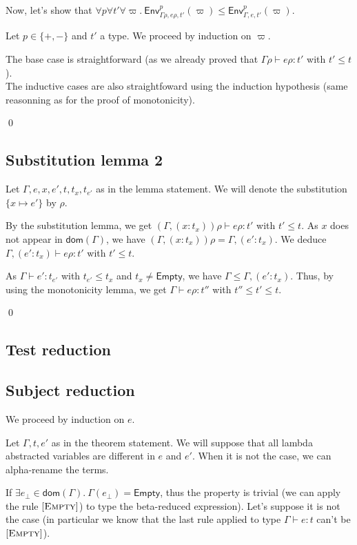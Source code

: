 \documentclass[a4paper]{article}%
\newcommand{\dom}[1]{\textsf{dom}(#1)}
\newcommand{\Empty} {\textsf{Empty}}%
\newcommand{\subst}[2]{\{#1 \mapsto #2\}}
\newcommand{\Gp}[2]{\textsf{Env}^{#1}_{#2}}
\theoremstyle{definition}
\newcommand {\Rule}[1] {[\textsc{#1}]}
\begin{document}
    Now, let's show that $\forall p \forall t' \forall \varpi.\ \Gp p {\Gamma\rho,e\rho,t'} (\varpi) \leq \Gp p {\Gamma,e,t'} (\varpi)$.

    Let $p\in \{+,-\}$ and $t'$ a type.
    We proceed by induction on $\varpi$.

    The base case is straightforward (as we already proved that $\Gamma \rho \vdash e \rho:t'$ with $t'\leq t$).\\
    The inductive cases are also straightfoward using the induction hypothesis (same reasonning as for the proof of monotonicity).

    \qed

    \subsection{Substitution lemma 2}

    Let $\Gamma,e,x,e',t,t_x,t_{e'}$ as in the lemma statement.
    We will denote the substitution $\subst x {e'}$ by $\rho$.

    By the substitution lemma, we get $(\Gamma, (x:t_x))\rho \vdash e\rho:t'$ with $t' \leq t$.
    As $x$ does not appear in $\dom \Gamma$, we have $(\Gamma, (x:t_x))\rho = \Gamma, (e':t_x)$.
    We deduce $\Gamma, (e':t_x) \vdash e\rho:t'$ with $t' \leq t$.

    As $\Gamma \vdash e':t_{e'}$ with $t_{e'} \leq t_x$ and $t_x \neq \Empty$, we have $\Gamma \leq \Gamma, (e':t_x)$.
    Thus, by using the monotonicity lemma, we get $\Gamma\vdash e\rho:t''$ with $t'' \leq t' \leq t$.

    \qed

    \subsection{Test reduction}

    \subsection{Subject reduction}

    We proceed by induction on $e$.

    Let $\Gamma,t,e'$ as in the theorem statement.
    We will suppose that all lambda abstracted variables are different in $e$ and $e'$. When it is not the case, we can alpha-rename the terms.

    If $\exists e_{\bot} \in \dom\Gamma.\ \Gamma(e_{\bot}) = \Empty$, thus the property is trivial
    (we can apply the rule $\Rule {Empty}$) to type the beta-reduced expression).
    Let's suppose it is not the case (in particular we know that the last rule applied to type $\Gamma \vdash e:t$ can't be $\Rule{Empty}$).
\end{document}
